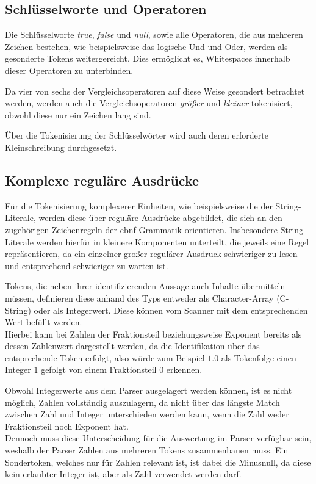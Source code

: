 \documentclass[oneside]{ausarbeitung}
\begin{document}
\subsection{Schlüsselworte und Operatoren}

Die Schlüsselworte \textit{true}, \textit{false} und \textit{null}, sowie alle Operatoren, die aus mehreren Zeichen bestehen, wie beispielsweise das logische Und und Oder, werden als gesonderte Tokens weitergereicht. Dies ermöglicht es, Whitespaces innerhalb dieser Operatoren zu unterbinden. 

Da vier von sechs der Vergleichsoperatoren auf diese Weise gesondert betrachtet werden, werden auch die Vergleichsoperatoren \textit{größer} und \textit{kleiner} tokenisiert, obwohl diese nur ein Zeichen lang sind.

Über die Tokenisierung der Schlüsselwörter wird auch deren erforderte Kleinschreibung durchgesetzt.

\subsection{Komplexe reguläre Ausdrücke}

Für die Tokenisierung komplexerer Einheiten, wie beispielsweise die der String-Literale, werden diese über reguläre Ausdrücke abgebildet, die sich an den zugehörigen Zeichenregeln der \ac{ebnf}-Grammatik orientieren. Insbesondere String-Literale werden hierfür in kleinere Komponenten unterteilt, die jeweils eine Regel repräsentieren, da ein einzelner großer regulärer Ausdruck schwieriger zu lesen und entsprechend schwieriger zu warten ist.

Tokens, die neben ihrer identifizierenden Aussage auch Inhalte übermitteln müssen, definieren diese anhand des Typs entweder als Character-Array (C-String) oder als Integerwert. Diese können vom Scanner mit dem entsprechenden Wert befüllt werden. \\
Hierbei kann bei Zahlen der Fraktionsteil beziehungsweise Exponent bereits als dessen Zahlenwert dargestellt werden, da die Identifikation über das entsprechende Token erfolgt, also würde zum Beispiel $1.0$ als Tokenfolge einen Integer $1$ gefolgt von einem Fraktionsteil $0$ erkennen. 

\pagebreak

Obwohl Integerwerte aus dem Parser ausgelagert werden können, ist es nicht möglich, Zahlen vollständig auszulagern, da nicht über das längste Match zwischen Zahl und Integer unterschieden werden kann, wenn die Zahl weder Fraktionsteil noch Exponent hat. \\
Dennoch muss diese Unterscheidung für die Auswertung im Parser verfügbar sein, weshalb der Parser Zahlen aus mehreren Tokens zusammenbauen muss. Ein Sondertoken, welches nur für Zahlen relevant ist, ist dabei die Minusnull, da diese kein erlaubter Integer ist, aber als Zahl verwendet werden darf.
\end{document}
